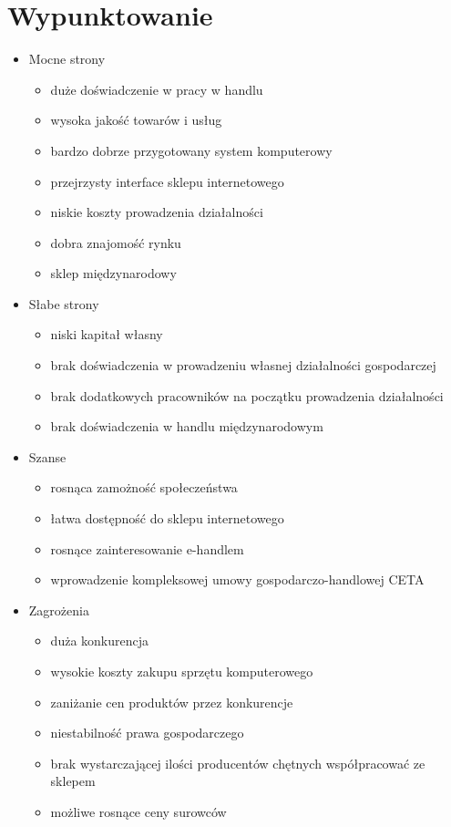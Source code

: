 \section{Wypunktowanie}
	\begin{itemize}	
		\item Mocne strony
			\begin{itemize}
				\item duże doświadczenie w pracy w handlu
				\item wysoka jakość towarów i usług
				\item bardzo dobrze przygotowany system komputerowy
				\item przejrzysty interface sklepu internetowego
				\item niskie koszty prowadzenia działalności
				\item dobra znajomość rynku
				\item sklep międzynarodowy
			\end{itemize}
			
		\item Słabe strony
			\begin{itemize}
				\item niski kapitał własny
				\item brak doświadczenia w prowadzeniu własnej działalności gospodarczej
				\item brak dodatkowych pracowników na początku prowadzenia działalności
				\item brak doświadczenia w handlu międzynarodowym
			\end{itemize}
			
		\item Szanse
			\begin{itemize}
				\item rosnąca zamożność społeczeństwa
				\item łatwa dostępność do sklepu internetowego
				\item rosnące zainteresowanie e-handlem
				\item wprowadzenie kompleksowej umowy gospodarczo-handlowej CETA
			\end{itemize}
			
		\item Zagrożenia
			\begin{itemize}
				\item duża konkurencja
				\item wysokie koszty zakupu sprzętu komputerowego
				\item zaniżanie cen produktów przez konkurencje
				\item niestabilność prawa gospodarczego
				\item brak wystarczającej ilości producentów chętnych współpracować ze sklepem
				\item możliwe rosnące ceny surowców
			\end{itemize}
	\end{itemize}
